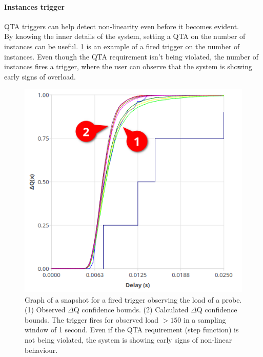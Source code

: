         \paragraph{Instances trigger}

        QTA triggers can help detect non-linearity even before it becomes evident. \\
        By knowing the inner details of the system, setting a QTA on the number of instances can be useful. \cref{fig:qta_trig} is an example of a fired trigger on the number of instances. Even though the QTA requirement isn't being violated, the number of instances fires a trigger, where the user can observe that the system is showing early signs of overload.

        \begin{figure}[H]
            \begin{center}
                \includegraphics[scale=0.5]{img/overload_2/fired_samplea.png}
            \end{center}
            \caption{Graph of a snapshot for a fired trigger observing the load of a probe. (1) Observed $\Delta$Q confidence bounds. (2) Calculated $\Delta$Q confidence bounds. The trigger fires for observed load $> 150$ in a sampling window of 1 second. Even if the QTA requirement (step function) is not being violated, the system is showing early signs of non-linear behaviour.}%
            \label{fig:qta_trig}%
        \end{figure}
  
